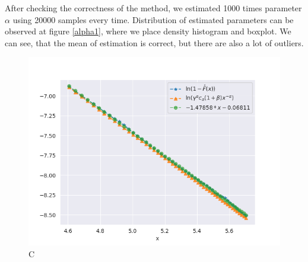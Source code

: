\documentclass{article}
\begin{document}
		After checking the correctness of the method, we estimated 1000 times parameter $\alpha$ using 20000 samples every time.
		Distribution of estimated parameters can be observed at figure \ref{alpha1}, where we place density histogram and boxplot.
		We can see, that the mean of estimation is correct, but there are also a lot of outliers.		 
		
		\begin{figure}
			\centering
			\includegraphics[width=1\linewidth]{images/compare_cdf_plots_type_1.png}
			\caption{C}\label{tails1}
		\end{figure}
\end{document}
